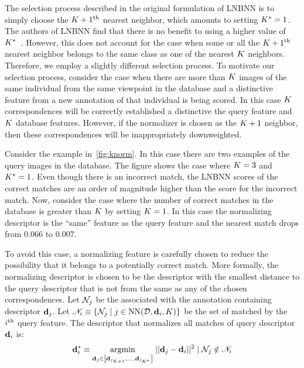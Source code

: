            The selection process described in the original formulation of LNBNN is to simply choose the %
            $K + 1^{\textrm{th}}{}$ nearest neighbor, which amounts to setting $K^{*}=1$. The authors of LNBNN find that there is
            no benefit to using a higher value of $K^{*}$~\cite{mccann_local_2012}. However, this does not account
            for the case when some or all the $K + 1^{\textrm{th}}{}$ nearest neighbor belongs to the same class as one of
            the nearest $K$ neighbors. Therefore, we employ a slightly different selection process. To motivate
            our selection process, consider the case when there are more than $K$ images of the same individual
            from the same viewpoint in the database and a distinctive feature from a new annotation of that
            individual is being scored. In this case $K$ correspondences will be correctly established a
            distinctive the query feature and $K$ database features. However, if the normalizer is chosen as the
            $K + 1$ neighbor, then these correspondences will be inappropriately downweighted.
              
            Consider the example in~\cref{fig:knorm}. In this case there are two examples
             of the query images in the database. The figure shows the case where
            $K=3$ and $K^{*}=1$. Even though there is an incorrect match, the LNBNN scores of the correct matches
            are an order of magnitude higher than the score for the incorrect match. Now, consider the case where
            the number of correct matches in the database is greater than $K$ by setting $K=1$. In this case the
            normalizing descriptor is the ``same'' feature as the query feature and the nearest match drops from
            $0.066$ to $0.007$.

            \knorm{}

            To avoid this case, a normalizing feature is carefully chosen to reduce the possibility that it belongs
            to a potentially correct match. More formally, the normalizing descriptor is chosen to be the
            descriptor with the smallest distance to the query descriptor that is not from the same \name{} as any
            of the chosen correspondences. Let $\mathcal{N}_j$ be the \name{} associated with the annotation containing
            descriptor $\mathbf{d}_j$. Let %
            $\mathscr{N}_i \equiv \left\{\mathcal{N}_j \mid j \in \operatorname{NN}(\mathcal{D}, \mathbf{d}_i, K)\right\}$
            be the set of \names{} matched by the $i^{\textrm{th}}{}$ query feature. The descriptor that normalizes all
            matches of query descriptor $\mathbf{d}_i$ is:
              \begin{equation}
                  \mathbf{d}^{*}_{i} \equiv 
                  \underset{\mathbf{d}_j \in \left[\mathbf{d}_{{j_{K + 1}}}, \ldots{}, \mathbf{d}_{j_{K^{*}}}\right]}{\operatorname{argmin}}\;
                  ||\mathbf{d}_j - \mathbf{d}_i||^2 \mid \mathcal{N}_j \notin \mathscr{N}_i
              \end{equation}


